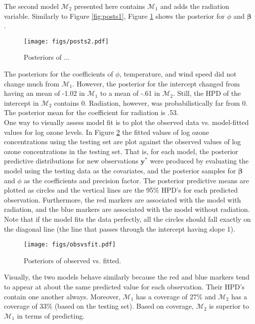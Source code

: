 \documentclass{../../tex_template/asaproc}
\newcommand{\y}{\bm y}
\newcommand{\M}{\mathcal{M}}
\begin{document}
The second model $\M_2$ presented here contains $\M_1$ and adds the radiation
variable. Similarly to Figure \ref{fig:posts1}, Figure \ref{fig:posts2} shows
the posterior for $\phi$ and $\bm\beta$.
\begin{figure}[H]
  \texttt{[image: figs/posts2.pdf]}
  \caption{\small Posteriors of ... }
  \label{fig:posts2}
\end{figure}
The posteriors for the coefficients of $\phi$, temperature, and wind speed
did not change much from $\M_1$. However, the posterior for the intercept changed
from having an mean of -1.02 in $\M_1$ to a mean of -.61 in $\M_2$. Still, the
HPD of the intercept in $\M_2$ contains 0. Radiation, however, was probabilistically
far from 0. The posterior mean for the coefficient for radiation is .53. \\

One way to visually assess model fit is to plot the observed data vs.
model-fitted values for log ozone levels. In Figure \ref{fig:obsvsfit}
the fitted values of log ozone concentrations using the testing set are plot
against the observed values of log ozone concentrations in the testing set.
That is, for each model, the posterior predictive distributions for new observations
$\y^*$ were produced by evaluating the model using the testing data as the covariates,
and the posterior samples for $\bm\beta$ and $\phi$ as the coefficients and precision
factor. The posterior predictive means are plotted as circles and the vertical lines
are the 95\% HPD's for each predicted observation. Furthermore, the red markers 
are associated with the model with radiation, and the blue markers are associated with
the model without radiation. Note that if the model fits the data perfectly,
all the circles should fall exactly on the diagonal line (the line that passes
through the intercept having slope 1).\\

\begin{figure}[H]
  \texttt{[image: figs/obsvsfit.pdf]}
  \caption{\small Posteriors of observed vs. fitted. }
  \label{fig:obsvsfit}
\end{figure}

Visually, the two models behave similarly because the red and blue markers tend
to appear at about the same predicted value for each observation. Their HPD's
contain one another always. Moreover, $\M_1$ has a coverage of 27\% and $\M_2$ has
a coverage of 33\% (based on the testing set). Based on coverage, $\M_2$ is superior
to $\M_1$ in terms of predicting.\\
\end{document}
